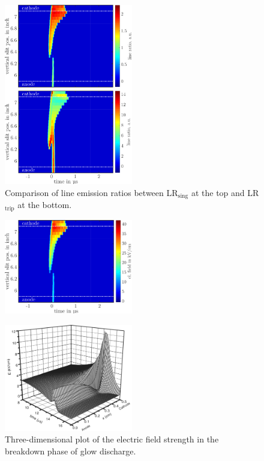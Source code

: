\documentclass[a4paper,10pt,twoside]{article}
\newcommand{\ix}[1]{_\text{#1}}
\begin{document}
				\begin{figure}
					\centering
					\hspace{-0.5cm}\includegraphics[width=0.5\textwidth]{figures/lineratio/combinations/lineratio667over706.pdf}
					\caption{Comparison of line emission ratios between LR$\ix{sing}$ at the top and LR$\ix{trip}$ at the bottom.}
					\label{img:comparisonlineratio}
				\end{figure}
				
				\begin{figure}
					\centering
					\hspace{0.5cm}\includegraphics[width=0.5\textwidth]{figures/lineratio/combinations/electricfield667.pdf}
					\caption{}
					\label{img:elfield667}
				\end{figure}
		
				\begin{figure}
					\centering
					\includegraphics[width=0.5\textwidth]{figures/lineratio/golubovskiip47fig9}
					\caption{Three-dimensional plot of the electric field strength in the breakdown phase of glow discharge. \cite{0022-3727-36-1-306}}
					\label{img:golubovskii}
				\end{figure}
				
\end{document}
